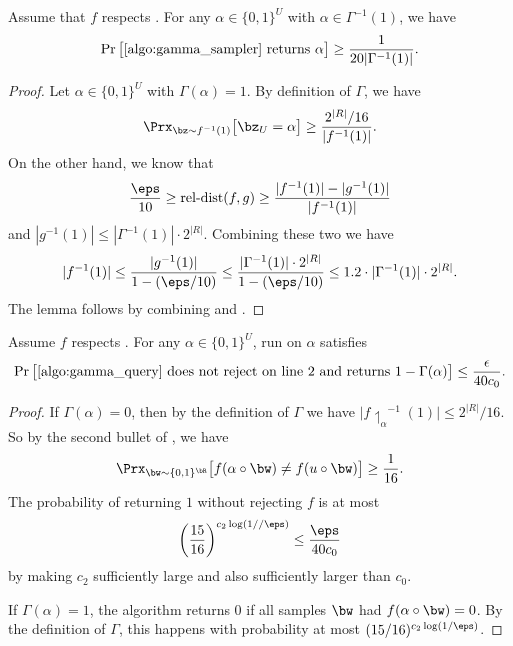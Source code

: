 \documentclass[11pt]{article}
\theoremstyle{definition}
\begin{document}
\begin{lemma}\label{thm: samples are almost uniform}
    Assume that $f$ respects . 
    For any $\alpha\in \{0,1\}^U$ with $\alpha \in \Gamma^{-1}(1)$, we have
$$
\Pr\big[\text{\Cref{algo:gamma_sampler} returns }\alpha\big] \geq \frac{1}{20|\Gamma^{-1}(1)|}.$$
\end{lemma}
\begin{proof}
Let $\alpha\in \{0,1\}^U$ with $\Gamma(\alpha)=1$.
By definition of $\Gamma$, we have
\begin{equation}
        \Prx_{\bz \sim f^{-1}(1)}\big[\bz_U=\alpha\big] \ge \frac{2^{|R|}/16}{|f^{-1}(1)|}.\label{eq:a}
\end{equation}
    On the other hand, 
      we know that
      $$
      \frac{\eps}{10}\ge \reldist(f,g)\ge 
      \frac{|f^{-1}(1)|-|g^{-1}(1)|}{|f^{-1}(1)|}
      $$
      and $|g^{-1}(1)|\le 
  |\Gamma^{-1}(1)|\cdot 2^{|R|}$.
Combining these two we have
    \begin{equation}
    |f^{-1}(1)|\le \frac{|g^{-1}(1)|}{1-(\eps/10)}\le  \frac{|\Gamma^{-1}(1)|\cdot 2^{|R|}}{1-(\eps/10)} \le 1.2\cdot |\Gamma^{-1}(1)|\cdot 2^{|R|}.\label{eq:b}
    \end{equation}
The lemma follows by combining  and .
\end{proof}

\begin{lemma}\label{thm: no query mistake when far}
    Assume $f$ respects . For any $\alpha\in \{0,1\}^U$, 
     run on $\alpha$ satisfies
$$
    \Pr\big[\text{\Cref{algo:gamma_query} does not reject on line {2}
and  returns $1-\Gamma(\alpha)$}\big]
    \le \frac{\epsilon}{40c_0}.$$
\end{lemma}
\begin{proof}
If $\Gamma(\alpha)=0$, then by the definition of $\Gamma$ we have $|f{\upharpoonleft_\alpha}^{-1}(1)|\le 2^{|R|}/16.$ So {by the second bullet of , we have}
    $$\Prx_{\bw \sim \{0,1\}^{\bR}}\big[f(\alpha \circ \bw) \neq f(u \circ \bw)\big] \geq \frac{1}{16}.$$ 
The probability of  
  returning $1$ without rejecting $f$  is at most
$$
\left(\frac{15}{16}\right)^{c_2\log (1//\eps)}\le \frac{\eps}{40c_0}
$$
by making $c_2$ sufficiently large and also sufficiently larger than $c_0$.


If $\Gamma(\alpha)=1$, 
the algorithm returns $0$ if all samples  $\bw$  had $f(\alpha\circ \bw)=0$.
By the definition of $\Gamma$, this happens with probability at 
  most $(15/16)^{c_2\log (1/\eps)}$.
\end{proof}
\end{document}
